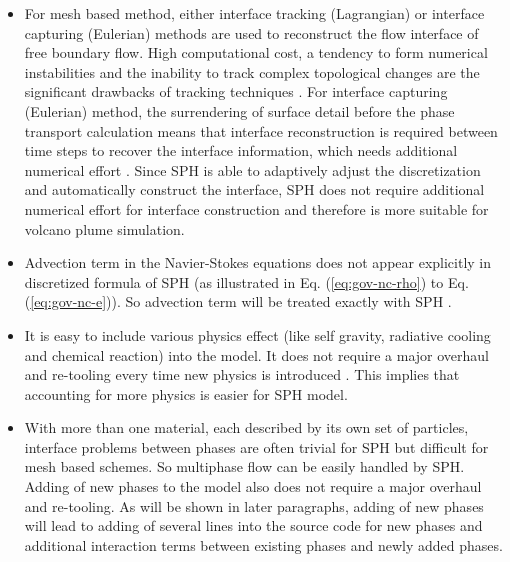 \documentclass[journal abbreviation, manuscript]{copernicus}
\begin{document}
\begin{itemize}
\item For mesh based method, either interface tracking (Lagrangian) \citep{harlow1965numerical, wrobel1991computational, cheng1995simplified} or interface capturing (Eulerian) \citep{hirt1981volume, youngs1982time, gerlach2006comparison, gopala2008volume} methods are used to reconstruct the flow interface of free boundary flow. High computational cost, a tendency to form numerical instabilities and the inability to track complex topological changes are the significant drawbacks of tracking techniques \citep{hirt1981volume, unverdi1992front, anderson1998diffuse}. For interface capturing (Eulerian) method, the surrendering of surface detail before the phase transport calculation means that interface reconstruction is required between time steps to recover the interface information, which needs additional numerical effort \citep{hirt1981volume, youngs1982time}. Since SPH is able to adaptively adjust the discretization and automatically construct the interface, SPH does not require additional numerical effort for interface construction and therefore is more suitable for volcano plume simulation.
\item Advection term in the Navier-Stokes equations does not appear explicitly in discretized formula of SPH (as illustrated in Eq. (\ref{eq:gov-nc-rho}) to Eq. (\ref{eq:gov-nc-e})). So advection term will be treated exactly with SPH \citep{monaghan2005smoothed}.
\item It is easy to include various physics effect (like self gravity, radiative cooling and chemical reaction) into the model. It does not require a major overhaul and re-tooling every time new physics is introduced \citep{monaghan1995sph}. This implies that accounting for more physics is easier for SPH model.
\item With more than one material, each described by its own set of particles, interface problems between phases are often trivial for SPH but difficult for mesh based schemes. So multiphase flow can be easily handled by SPH. Adding of new phases to the model also does not require a major overhaul and re-tooling. As will be shown in later paragraphs, adding of new phases will lead to adding of several lines into the source code for new phases and additional interaction terms between existing phases and newly added phases.
\end{itemize}
\end{document}
